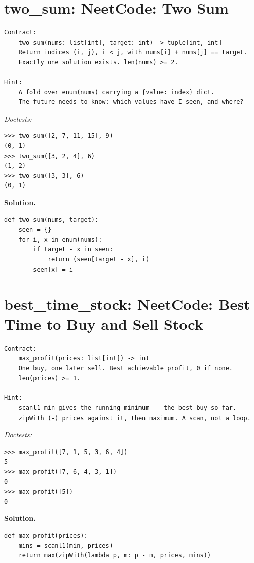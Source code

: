 \documentclass[11pt,letterpaper]{book}
\begin{document}
\section{two\_sum: NeetCode: Two Sum}
\begin{lstlisting}[style=spec]
Contract:
    two_sum(nums: list[int], target: int) -> tuple[int, int]
    Return indices (i, j), i < j, with nums[i] + nums[j] == target.
    Exactly one solution exists. len(nums) >= 2.

Hint:
    A fold over enum(nums) carrying a {value: index} dict.
    The future needs to know: which values have I seen, and where?
\end{lstlisting}
\noindent\textit{Doctests:}
\begin{lstlisting}[style=spec]
>>> two_sum([2, 7, 11, 15], 9)
(0, 1)
>>> two_sum([3, 2, 4], 6)
(1, 2)
>>> two_sum([3, 3], 6)
(0, 1)
\end{lstlisting}
\noindent\textbf{Solution.}
\begin{lstlisting}[style=code]
def two_sum(nums, target):
    seen = {}
    for i, x in enum(nums):
        if target - x in seen:
            return (seen[target - x], i)
        seen[x] = i
\end{lstlisting}

\section{best\_time\_stock: NeetCode: Best Time to Buy and Sell Stock}
\begin{lstlisting}[style=spec]
Contract:
    max_profit(prices: list[int]) -> int
    One buy, one later sell. Best achievable profit, 0 if none.
    len(prices) >= 1.

Hint:
    scanl1 min gives the running minimum -- the best buy so far.
    zipWith (-) prices against it, then maximum. A scan, not a loop.
\end{lstlisting}
\noindent\textit{Doctests:}
\begin{lstlisting}[style=spec]
>>> max_profit([7, 1, 5, 3, 6, 4])
5
>>> max_profit([7, 6, 4, 3, 1])
0
>>> max_profit([5])
0
\end{lstlisting}
\noindent\textbf{Solution.}
\begin{lstlisting}[style=code]
def max_profit(prices):
    mins = scanl1(min, prices)
    return max(zipWith(lambda p, m: p - m, prices, mins))
\end{lstlisting}
\end{document}
